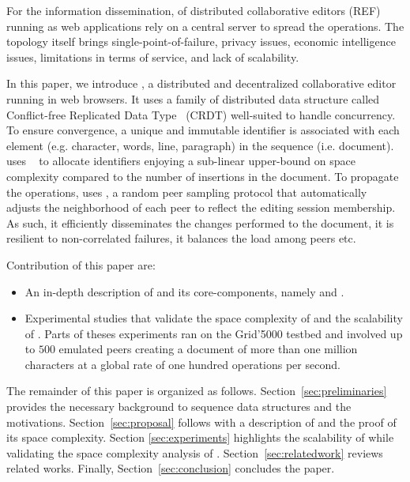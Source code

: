 For the information dissemination,  of distributed collaborative
editors (REF) running as web applications rely on a central server to spread the
operations. The topology itself brings single-point-of-failure, privacy issues,
economic intelligence issues, limitations in terms of service, and lack of
scalability.

In this paper, we introduce \CRATE, a distributed and decentralized
collaborative editor running in web browsers. It uses a family of distributed
data structure called Conflict-free Replicated Data
Type~\cite{shapiro2011comprehensive, shapiro2011conflict} (CRDT) well-suited to
handle concurrency. To ensure convergence, a unique and immutable identifier is
associated with each element (e.g. character, words, line, paragraph) in the
sequence (i.e. document). \CRATE uses \LSEQ~\cite{nedelec2013concurrency,
  nedelec2013lseq} to allocate identifiers enjoying a sub-linear upper-bound on
space complexity compared to the number of insertions in the document. To
propagate the operations, \CRATE uses \SPRAY, a random peer sampling protocol
that automatically adjusts the neighborhood of each peer to reflect the editing
session membership. As such, it efficiently disseminates the changes performed
to the document, it is resilient to non-correlated failures, it balances the
load among peers etc.

Contribution of this paper are:
\begin{itemize}
\item An in-depth description of \CRATE and its core-components, namely \LSEQ
  and \SPRAY.
\item Experimental studies that validate the space complexity of \LSEQ and the
  scalability of \CRATE. Parts of theses experiments ran on the Grid'5000
  testbed and involved up to $500$ emulated peers creating a document of more
  than one million characters at a global rate of one hundred operations per
  second.
\end{itemize}

The remainder of this paper is organized as
follows. Section~\ref{sec:preliminaries} provides the necessary background to
sequence data structures and the motivations. Section~\ref{sec:proposal}
follows with a description of \LSEQ and the proof of its space
complexity. Section \ref {sec:experiments} highlights the scalability of
\CRATE while validating the space complexity analysis of
\LSEQ. Section~\ref{sec:relatedwork} reviews related works. Finally,
Section~\ref{sec:conclusion} concludes the paper.


